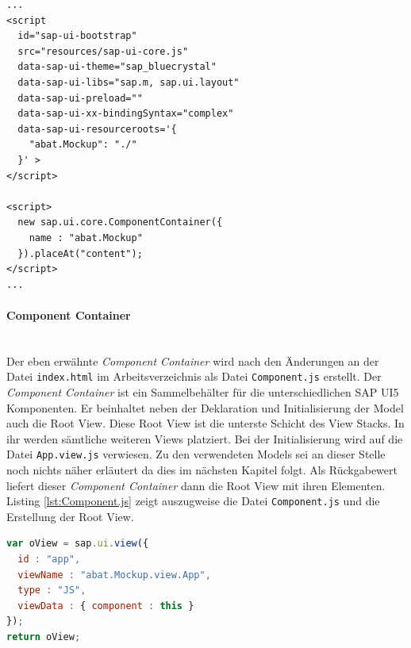 \vspace{2em}
\begin{lstlisting}[language=HTML5, caption=Bootstrapping der SAP UI5 Applikation, label=lst:bootstrapping]
...
<script
  id="sap-ui-bootstrap"
  src="resources/sap-ui-core.js"
  data-sap-ui-theme="sap_bluecrystal"
  data-sap-ui-libs="sap.m, sap.ui.layout"
  data-sap-ui-preload="" 
  data-sap-ui-xx-bindingSyntax="complex"
  data-sap-ui-resourceroots='{
    "abat.Mockup": "./"
  }' >
</script>

<script>
  new sap.ui.core.ComponentContainer({
    name : "abat.Mockup"
  }).placeAt("content");
</script>
...
\end{lstlisting}
	
\paragraph{Component Container}$\;$ \\
Der eben erwähnte \textit{Component Container} wird nach den Änderungen an der Datei \texttt{index.html} im Arbeitsverzeichnis als Datei \texttt{Component.js} erstellt. Der \textit{Component Container} ist ein Sammelbehälter für die unterschiedlichen SAP UI5 Komponenten. Er beinhaltet neben der Deklaration und Initialisierung der Model auch die Root View. Diese Root View ist die unterste Schicht des View Stacks. In ihr werden sämtliche weiteren Views platziert. Bei der Initialisierung wird auf die Datei \texttt{App.view.js} verwiesen. Zu den verwendeten Models sei an dieser Stelle noch nichts näher erläutert da dies im nächsten Kapitel folgt. Als Rückgabewert liefert dieser \textit{Component Container} dann die Root View mit ihren Elementen. Listing \ref{lst:Component.js} zeigt auszugweise die Datei \texttt{Component.js} und die Erstellung der Root View.

\vspace{1em}
\begin{lstlisting}[language=JavaScript, caption=Auszug aus der Datei \texttt{Component.js}, label=lst:Component.js]
var oView = sap.ui.view({
  id : "app",
  viewName : "abat.Mockup.view.App",
  type : "JS",
  viewData : { component : this }
});
return oView;
\end{lstlisting}
	
